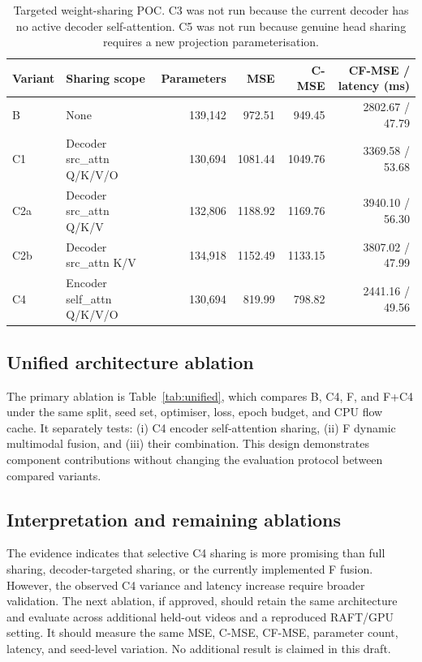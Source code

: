 \begin{table}[t]
\centering
\scriptsize
\caption{Targeted weight-sharing POC. C3 was not run because the current decoder has no active decoder self-attention. C5 was not run because genuine head sharing requires a new projection parameterisation.}
\label{tab:targeted}
\begin{tabular}{llrrrr}
\toprule
Variant & Sharing scope & Parameters & MSE & C-MSE & CF-MSE / latency (ms)\\
\midrule
B & None & 139,142 & 972.51 & 949.45 & 2802.67 / 47.79\\
C1 & Decoder src\_attn Q/K/V/O & 130,694 & 1081.44 & 1049.76 & 3369.58 / 53.68\\
C2a & Decoder src\_attn Q/K/V & 132,806 & 1188.92 & 1169.76 & 3940.10 / 56.30\\
C2b & Decoder src\_attn K/V & 134,918 & 1152.49 & 1133.15 & 3807.02 / 47.99\\
C4 & Encoder self\_attn Q/K/V/O & 130,694 & 819.99 & 798.82 & 2441.16 / 49.56\\
\bottomrule
\end{tabular}
\end{table}

\subsection{Unified architecture ablation}
The primary ablation is Table~\ref{tab:unified}, which compares B, C4, F, and F+C4 under the same split, seed set, optimiser, loss, epoch budget, and CPU flow cache. It separately tests: (i) C4 encoder self-attention sharing, (ii) F dynamic multimodal fusion, and (iii) their combination. This design demonstrates component contributions without changing the evaluation protocol between compared variants.

\subsection{Interpretation and remaining ablations}
The evidence indicates that selective C4 sharing is more promising than full sharing, decoder-targeted sharing, or the currently implemented F fusion. However, the observed C4 variance and latency increase require broader validation. The next ablation, if approved, should retain the same architecture and evaluate across additional held-out videos and a reproduced RAFT/GPU setting. It should measure the same MSE, C-MSE, CF-MSE, parameter count, latency, and seed-level variation. No additional result is claimed in this draft.
